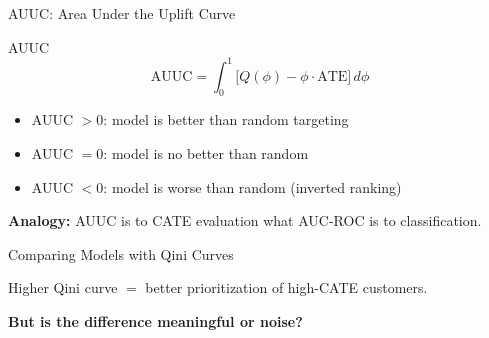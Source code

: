 \documentclass[aspectratio=169, 11pt]{beamer}
\begin{document}
\begin{frame}{AUUC: Area Under the Uplift Curve}
 
\begin{block}{AUUC}
\[
\text{AUUC} = \int_0^1 \bigl[Q(\phi) - \phi \cdot \text{ATE}\bigr] \, d\phi
\]
\end{block}
 
\bigskip
 
\begin{itemize}
    \item AUUC $> 0$: model is better than random targeting
    \item AUUC $= 0$: model is no better than random
    \item AUUC $< 0$: model is worse than random (inverted ranking)
\end{itemize}
 
\bigskip
 
\textbf{Analogy:} AUUC is to CATE evaluation what AUC-ROC is to classification.
\end{frame}
 
\begin{frame}{Comparing Models with Qini Curves}
 
\begin{center}
\end{center}
 
\bigskip
 
Higher Qini curve $=$ better prioritization of high-CATE customers.
 
\bigskip
 
\textbf{But is the difference meaningful or noise?}
\end{frame}
 
\end{document}
